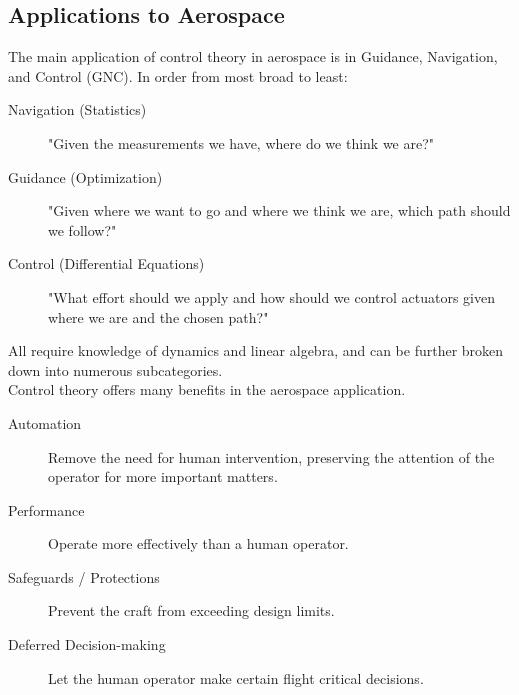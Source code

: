 \documentclass[../notes.tex]{subfiles}
\begin{document}
\subsection{Applications to Aerospace}
The main application of control theory in aerospace is in Guidance, Navigation, and Control (GNC). In order from most broad to least:
\begin{description}
    \item[Navigation (Statistics)] "Given the measurements we have, where do we think we are?"
    \item[Guidance (Optimization)] "Given where we want to go and where we think we are, which path should we follow?"
    \item[Control (Differential Equations)] "What effort should we apply and how should we control actuators given where we are and the chosen path?"
\end{description}
All require knowledge of dynamics and linear algebra, and can be further broken down into numerous subcategories.\\ 
Control theory offers many benefits in the aerospace application. 
\begin{description}
    \item[Automation] Remove the need for human intervention, preserving the attention of the operator for more important matters.
    \item[Performance] Operate more effectively than a human operator.
    \item[Safeguards / Protections] Prevent the craft from exceeding design limits.
    \item[Deferred Decision-making] Let the human operator make certain flight critical decisions.
\end{description}
\end{document}
